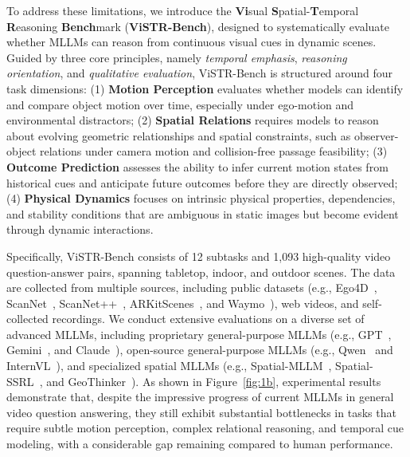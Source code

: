 To address these limitations, we introduce the \textbf{Vi}sual \textbf{S}patial-\textbf{T}emporal \textbf{R}easoning \textbf{Bench}mark (\textbf{ViSTR-Bench}), designed to systematically evaluate whether MLLMs can reason from continuous visual cues in dynamic scenes. 
Guided by three core principles, namely \textit{temporal emphasis}, \textit{reasoning orientation}, and \textit{qualitative evaluation}, ViSTR-Bench is structured around four task dimensions:
(1) \textbf{Motion Perception} evaluates whether models can identify and compare object motion over time, especially under ego-motion and environmental distractors;
(2) \textbf{Spatial Relations} requires models to reason about evolving geometric relationships and spatial constraints, such as observer-object relations under camera motion and collision-free passage feasibility;
(3) \textbf{Outcome Prediction} assesses the ability to infer current motion states from historical cues and anticipate future outcomes before they are directly observed; 
(4) \textbf{Physical Dynamics} focuses on intrinsic physical properties, dependencies, and stability conditions that are ambiguous in static images but become evident through dynamic interactions.

Specifically, ViSTR-Bench consists of 12 subtasks and 1,093 high-quality video question-answer pairs, spanning tabletop, indoor, and outdoor scenes. The data are collected from multiple sources, including public datasets (e.g., Ego4D~\citep{Ego4D}, ScanNet~\citep{ScanNet}, ScanNet++~\citep{ScanNet++}, ARKitScenes~\citep{ARKitScenes}, and Waymo~\citep{Waymo}), web videos, and self-collected recordings. 
We conduct extensive evaluations on a diverse set of advanced MLLMs, including proprietary general-purpose MLLMs (e.g., GPT~\citep{GPT-5}, Gemini~\citep{Gemini}, and Claude~\citep{Claude}), open-source general-purpose MLLMs (e.g., Qwen~\citep{Qwen3.5} and InternVL~\citep{InternVL3.5}), and specialized spatial MLLMs (e.g., Spatial-MLLM~\citep{Spatial-MLLM}, Spatial-SSRL~\citep{Spatial-SSRL}, and GeoThinker~\citep{GeoThinker}). As shown in Figure~\ref{fig:1b}, experimental results demonstrate that, despite the impressive progress of current MLLMs in general video question answering, they still exhibit substantial bottlenecks in tasks that require subtle motion perception, complex relational reasoning, and temporal cue modeling, with a considerable gap remaining compared to human performance.

